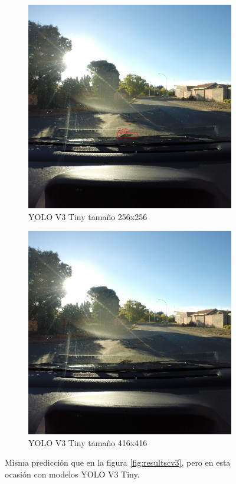 \begin{figure}[H]
	\centering
	\begin{subfigure}[h]{0.45\linewidth}
		\includegraphics[width=\linewidth]{images/results_c_yolo_v3_tiny_256.jpg}
		\caption{YOLO V3 Tiny tamaño 256x256}
	\end{subfigure}
	\begin{subfigure}[h]{0.45\linewidth}
		\includegraphics[width=\linewidth]{images/results_c_yolo_v3_tiny_416.jpg}
		\caption{YOLO V3 Tiny tamaño 416x416}
	\end{subfigure}
	\caption{Misma predicción que en la figura \ref{fig:resultscv3}, pero en esta ocasión con modelos YOLO V3 Tiny.}
	\label{fig:resultscv3tiny}
\end{figure}

